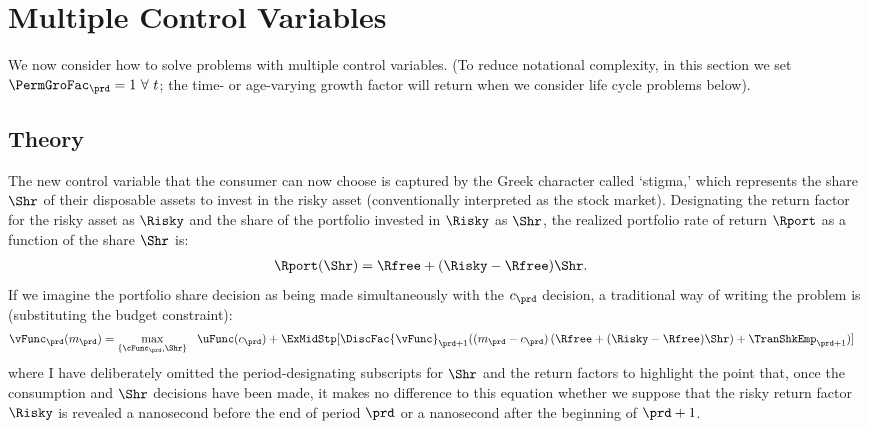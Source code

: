 \hypertarget{multiple-control-variables}{}
\section{Multiple Control Variables}

We now consider how to solve problems with multiple control variables.  (To reduce notational complexity, in this section we set $\PermGroFac_{\prd}=1~\forall~t$; the time- or age-varying growth factor will return when we consider life cycle problems below).

\subsection{Theory}\label{subsec:MCTheory}
The new control variable that the consumer can now choose is captured by the Greek character called `stigma,' which represents the  share $\Shr$ of their disposable assets to invest in the risky asset (conventionally interpreted as the stock market).  Designating the return factor for the risky asset as $\Risky$ and the share of the portfolio invested in $\Risky$ as $\Shr$, the realized portfolio rate of return $\Rport$ as a function of the share $\Shr$ is:
\begin{equation}\begin{gathered}\begin{aligned}
      \Rport(\Shr) &= \Rfree+(\Risky-\Rfree)\Shr \label{eq:Shr}.
    \end{aligned}\end{gathered}\end{equation}
If we imagine the portfolio share decision as being made simultaneously with the ${c}_{\prd}$ decision, a traditional way of writing the problem is (substituting the budget constraint):
\begin{equation}\begin{gathered}\begin{aligned}
      {\vFunc}_{\prd}({m}_{\prd})  & = \max_{\{\cFunc_{\prd},\Shr\}} ~~  \uFunc({c}_{\prd}) +  \ExMidStp[\DiscFac {\vFunc}_{\prd+1}(({m}_{\prd}-{c}_{\prd})\left({\Rfree+(\Risky-\Rfree)\Shr}\right) +        {\TranShkEmp}_{\prd+1})] \label{eq:Bellmanundated}
    \end{aligned}\end{gathered}\end{equation}
where I have deliberately omitted the period-designating subscripts for $\Shr$ and the return factors to highlight the point that, once the consumption and $\Shr$ decisions have been made, it makes no difference to this equation whether we suppose that the risky return factor $\Risky$ is revealed a nanosecond before the end of period $\prd$ or a nanosecond after the beginning of $\prd+1$.

